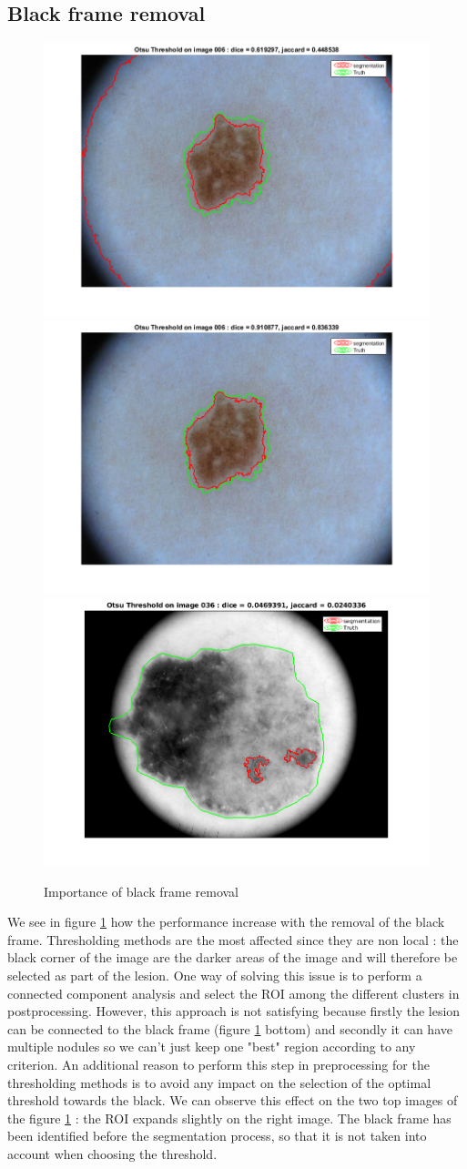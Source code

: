 \documentclass[a4paper,10pt]{article}
\begin{document}
\subsection{Black frame removal}

\begin{figure} 
	\centering
	\includegraphics[width=0.45\linewidth]{../results/blackframe/otsu_006_blackframe.png} 
	\includegraphics[width=0.45\linewidth]{../results/blackframe/otsu-segt-im-006.png} \\
	\includegraphics[width=0.5\linewidth]{../results/otsu/otsu-segt-im-036}
	\caption{Importance of black frame removal}
	\label{fig:blackframe}
\end{figure}


We see in figure \ref{fig:blackframe} how the performance increase with the removal of the black frame. Thresholding methods are the most affected since they are non local : the black corner of the image are the darker areas of the image and will therefore be selected as part of the lesion. One way of solving this issue is to perform a connected component analysis and select the ROI among the different clusters in postprocessing. However, this approach is not satisfying because firstly the lesion can be connected to the black frame (figure \ref{fig:blackframe} bottom) and secondly it can have multiple nodules so we can't just keep one "best" region according to any criterion. An additional reason to perform this step in preprocessing for the thresholding methods is to avoid any impact on the selection of the optimal threshold towards the black. We can observe this effect on the two top images of the figure \ref{fig:blackframe} : the ROI expands slightly on the right image. The black frame has been identified before the segmentation process, so that it is not taken into account when choosing the threshold.
\end{document}
